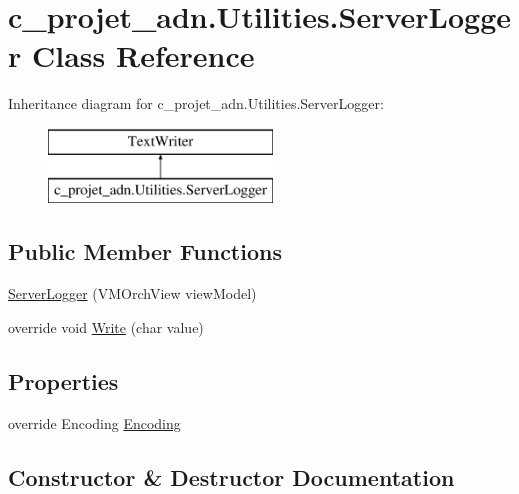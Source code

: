 \hypertarget{classc__projet__adn_1_1_utilities_1_1_server_logger}{}\section{c\+\_\+projet\+\_\+adn.\+Utilities.\+Server\+Logger Class Reference}
\label{classc__projet__adn_1_1_utilities_1_1_server_logger}
Inheritance diagram for c\+\_\+projet\+\_\+adn.\+Utilities.\+Server\+Logger\+:\begin{figure}[H]
\begin{center}
\leavevmode
\includegraphics[height=2.000000cm]{classc__projet__adn_1_1_utilities_1_1_server_logger}
\end{center}
\end{figure}
\subsection*{Public Member Functions}
\begin{DoxyCompactItemize}
\item 
\hyperlink{classc__projet__adn_1_1_utilities_1_1_server_logger_a803499d95977666e3fbcee0c74b7ec97}{Server\+Logger} (V\+M\+Orch\+View view\+Model)
\item 
override void \hyperlink{classc__projet__adn_1_1_utilities_1_1_server_logger_a1d8c27ad0c90a8e378d8ffaeb462aced}{Write} (char value)
\end{DoxyCompactItemize}
\subsection*{Properties}
\begin{DoxyCompactItemize}
\item 
override Encoding \hyperlink{classc__projet__adn_1_1_utilities_1_1_server_logger_a2637e6fbbb9b784ffb3e33c1240d2e02}{Encoding}
\end{DoxyCompactItemize}


\subsection{Constructor \& Destructor Documentation}
\mbox{\label{classc__projet__adn_1_1_utilities_1_1_server_logger_a803499d95977666e3fbcee0c74b7ec97}} 
